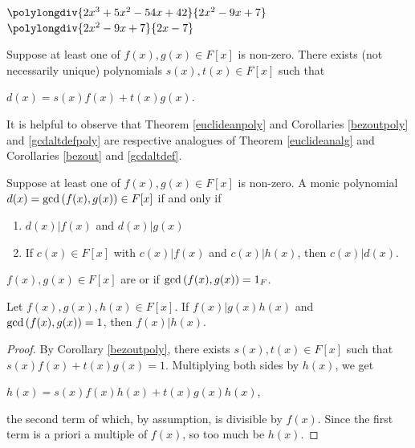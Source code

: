 \documentclass[11pt,fleqn,dvipsnames,usenames]{article}
\newcommand{\p}{\noindent}
\begin{document}
$\polylongdiv{2x^3 + 5x^2 - 54x + 42}{2x^2 - 9x + 7}$ \hfill $\polylongdiv{2x^2 - 9x + 7}{2x-7}$
\vspace{1cm}
\newpage

\begin{corollary}\label{bezoutpoly}
Suppose at least one of $f(x),g(x)\in F[x]$ is non-zero.  There exists (not necessarily unique) polynomials $s(x),t(x)\in F[x]$ such that
\begin{center}
$d(x) = s(x)f(x) + t(x)g(x)$.
\end{center}
\end{corollary}
\vsp

%
\p It is helpful to observe that Theorem \ref{euclideanpoly} and Corollaries \ref{bezoutpoly} and \ref{gcdaltdefpoly} are respective analogues of Theorem \ref{euclideanalg} and Corollaries \ref{bezout} and \ref{gcdaltdef}.
\vsp

\p {\color{blue}TODO: add example}
\vsp

\begin{corollary}\label{gcdaltdefpoly}
Suppose at least one of $f(x),g(x)\in F[x]$ is non-zero.  A monic polynomial $d(x) = \text{gcd}\left(f(x),g(x)\right)\in F[x]$ if and only if
\begin{enumerate}[(1)]
\item $d(x)|f(x)$ and $d(x)|g(x)$
\item If $c(x)\in F[x]$ with $c(x)|f(x)$ and $c(x)|h(x)$, then $c(x)|d(x)$.
\end{enumerate}
\end{corollary}
\vsmsp

%
\begin{definition}
$f(x),g(x)\in F[x]$ are  or  if $\text{gcd}\left(f(x),g(x)\right) = 1_{F}$.
\end{definition}
\vsmsp

%
\begin{theorem}\label{pdividesborcpoly}
Let $f(x),g(x),h(x)\in F[x]$.  If $f(x)|g(x)h(x)$ and $\text{gcd}\left(f(x),g(x)\right) = 1$, then $f(x)|h(x)$.
\end{theorem}
%
\begin{proof}
By Corollary \ref{bezoutpoly}, there exists $s(x),t(x)\in F[x]$ such that $s(x)f(x) + t(x)g(x) = 1$.  Multiplying both sides by $h(x)$, we get
\begin{center}
$h(x) = s(x)f(x)h(x) + t(x)g(x)h(x)$,
\end{center}
the second term of which, by assumption, is divisible by $f(x)$.  Since the first term is a priori a multiple of $f(x)$, so too much be $h(x)$.
\end{proof}
%
\end{document}
